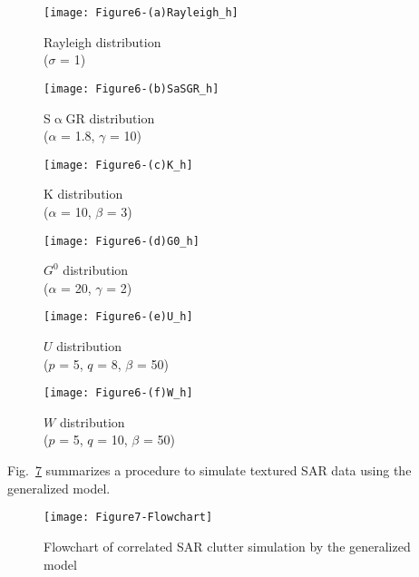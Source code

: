 \documentclass[journal]{IEEEtran}
\begin{document}
\begin{figure*}[hbt]
\centering
\begin{subfigure}[t]{4 cm}
	\centering
	\texttt{[image: Figure6-(a)Rayleigh\_h]}
	\caption{Rayleigh distribution \\($\sigma$ = 1)}\label{Figure6(a)}
\end{subfigure}
\qquad
\begin{subfigure}[t]{4 cm}
	\centering
	\texttt{[image: Figure6-(b)SaSGR\_h]}
	\caption{S$\upalpha$GR distribution \\($\alpha$ = 1.8, $\gamma$ = 10)}\label{Figure6(b)}
\end{subfigure}
\qquad
\begin{subfigure}[t]{4 cm}
	\centering
	\texttt{[image: Figure6-(c)K\_h]}
	\caption{K distribution \\($\alpha$ = 10, $\beta$ = 3)}\label{Figure6(c)}
\end{subfigure}
\qquad
\begin{subfigure}[t]{4 cm}
	\centering
	\texttt{[image: Figure6-(d)G0\_h]}
	\caption{$G^0$ distribution \\($\alpha$ = 20, $\gamma$ = 2)}\label{Figure6(d)}
\end{subfigure}
\qquad
\begin{subfigure}[t]{4 cm}
	\centering
	\texttt{[image: Figure6-(e)U\_h]}
	\caption{$U$ distribution \\($p$ = 5, $q$ = 8, $\beta$ = 50)}\label{Figure6(e)}
\end{subfigure}
\qquad
\begin{subfigure}[t]{4 cm}
	\centering
	\texttt{[image: Figure6-(f)W\_h]}
	\caption{$W$ distribution \\($p$ = 5, $q$ = 10, $\beta$ = 50)}\label{Figure6(f)}
\end{subfigure}
\caption{Simulated correlated SAR images using the Gaussian kernel in Eq. \eqref{eq43} with the generalized model}\label{Figure6}
\end{figure*}

Fig.~\ref{Figure7} summarizes a procedure to simulate textured SAR data using the generalized model.

\begin{figure}[hbt]
\centering
\texttt{[image: Figure7-Flowchart]}
\caption{Flowchart of correlated SAR clutter simulation by the generalized model}\label{Figure7}
\end{figure}
\end{document}
